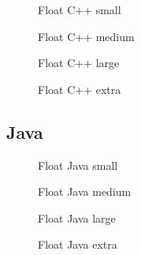 \begin{figure}[H]
    \centering
    
    \caption{Float C++ small}
    \label{fig:float:cpp:line:small}
\end{figure}
\begin{figure}[H]
    \centering
    
    \caption{Float C++ medium}
    \label{fig:float:cpp:line:medium}
\end{figure}
\begin{figure}[H]
    \centering
    
    \caption{Float C++ large}
    \label{fig:float:cpp:line:large}
\end{figure}
\begin{figure}[H]
    \centering
    
    \caption{Float C++ extra}
    \label{fig:float:cpp:line:extra}
\end{figure}

\subsection{Java}
\begin{figure}[H]
    \centering
    
    \caption{Float Java small}
    \label{fig:float:java:line:small}
\end{figure}
\begin{figure}[H]
    \centering
    
    \caption{Float Java medium}
    \label{fig:float:java:line:medium}
\end{figure}
\begin{figure}[H]
    \centering
    
    \caption{Float Java large}
    \label{fig:float:java:line:large}
\end{figure}
\begin{figure}[H]
    \centering
    
    \caption{Float Java extra}
    \label{fig:float:java:line:extra}
\end{figure}

